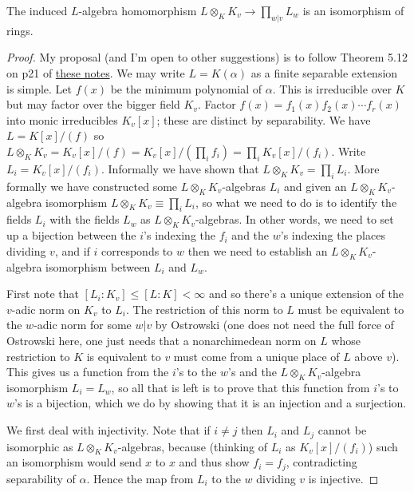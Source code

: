 \begin{theorem}
  \label{IsDedekindDomain.HeightOneSpectrum.adicCompletionComapAlgEquiv}
  \leanok
  The induced $L$-algebra homomorphism $L\otimes_KK_v\to\prod_{w|v}L_w$ is an
  isomorphism of rings.
\end{theorem}
\begin{proof}
  My proposal (and I'm open to other suggestions) is to follow Theorem 5.12 on p21
  of \href{https://math.berkeley.edu/~ltomczak/notes/Mich2022/LF_Notes.pdf}
  {these notes}. We may write $L=K(\alpha)$ as a finite separable extension is simple. Let $f(x)$
  be the minimum polynomial of $\alpha$. This is irreducible over $K$ but may factor over
  the bigger field $K_v$. Factor $f(x)=f_1(x)f_2(x)\cdots f_r(x)$ into
  monic irreducibles $K_v[x]$; these are distinct by separability. We have $L=K[x]/(f)$
  so $L\otimes_KK_v=K_v[x]/(f)=K_v[x]/(\prod_i f_i)=\prod_i K_v[x]/(f_i)$. Write
  $L_i=K_v[x]/(f_i)$. Informally we have shown that $L\otimes_KK_v=\prod_i L_i$. More formally
  we have constructed some $L\otimes_KK_v$-algebras $L_i$ and given an $L\otimes_KK_v$-algebra
  isomorphism $L\otimes_KK_v\equiv \prod_i L_i$, so what we need to do
  is to identify the fields $L_i$ with the fields $L_w$ as $L\otimes_KK_v$-algebras.
  In other words, we need
  to set up a bijection between the $i$'s indexing the $f_i$ and the $w$'s indexing the
  places dividing $v$, and if $i$ corresponds to $w$ then we need to establish an
  $L\otimes_K K_v$-algebra isomorphism between $L_i$ and $L_w$.

  First note that $[L_i:K_v]\leq [L:K]<\infty$ and so there's a unique extension of the $v$-adic
  norm on $K_v$ to $L_i$. The restriction of this norm to $L$ must be equivalent to the $w$-adic
  norm for some $w|v$ by Ostrowski (one does not need the full force of Ostrowski here,
  one just needs that a nonarchimedean norm on $L$ whose restriction to $K$ is equivalent to $v$
  must come from a unique place of $L$ above $v$). This gives us a function from the $i$'s
  to the $w$'s and the $L\otimes_K K_v$-algebra isomorphism $L_i=L_w$, so all that is left is
  to prove that this function from $i$'s to $w$'s is a bijection, which we do by showing that
  it is an injection and a surjection.

  We first deal with injectivity. Note that if $i\not=j$ then $L_i$ and $L_j$ cannot be isomorphic
  as $L\otimes_KK_v$-algebras, because (thinking of $L_i$ as $K_v[x]/(f_i)$) such an isomorphism
  would send $x$ to $x$ and thus show $f_i=f_j$, contradicting separability of $\alpha$. Hence the map
  from $L_i$ to the $w$ dividing $v$ is injective.


\end{proof}

